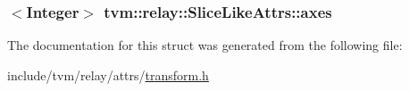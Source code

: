 \subsubsection[{\texorpdfstring{axes}{axes}}]{$<${\bf Integer}$>$ tvm\+::relay\+::\+Slice\+Like\+Attrs\+::axes}\hypertarget{structtvm_1_1relay_1_1SliceLikeAttrs_a51c18ba5f84813d9d48f3c09a61a58d1}{}\label{structtvm_1_1relay_1_1SliceLikeAttrs_a51c18ba5f84813d9d48f3c09a61a58d1}


The documentation for this struct was generated from the following file\+:\begin{DoxyCompactItemize}
\item 
include/tvm/relay/attrs/\hyperlink{include_2tvm_2relay_2attrs_2transform_8h}{transform.\+h}\end{DoxyCompactItemize}
